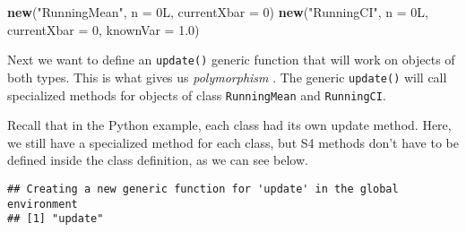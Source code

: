 \documentclass[12pt,krantz2]{krantz}
\makeatletter
\newenvironment{Shaded}{\begin{snugshade}}{\end{snugshade}}
\newcommand{\DataTypeTok}[1]{\textcolor[rgb]{0.27,0.27,0.27}{#1}}
\newcommand{\DecValTok}[1]{\textcolor[rgb]{0.06,0.06,0.06}{#1}}
\newcommand{\FloatTok}[1]{\textcolor[rgb]{0.06,0.06,0.06}{#1}}
\newcommand{\KeywordTok}[1]{\textcolor[rgb]{0.27,0.27,0.27}{\textbf{#1}}}
\newcommand{\NormalTok}[1]{#1}
\newcommand{\StringTok}[1]{\textcolor[rgb]{0.5,0.5,0.5}{#1}}
\newenvironment{kframe}{%
\medskip{}
\setlength{\fboxsep}{.8em}
 \def\at@end@of@kframe{}%
 \ifinner\ifhmode%
  \def\at@end@of@kframe{\end{minipage}}%
  \begin{minipage}{\columnwidth}%
 \fi\fi%
 \def\FrameCommand##1{\hskip\@totalleftmargin \hskip-\fboxsep
 \colorbox{shadecolor}{##1}\hskip-\fboxsep
     \hskip-\linewidth \hskip-\@totalleftmargin \hskip\columnwidth}%
 \MakeFramed {\advance\hsize-\width
   \@totalleftmargin\z@ \linewidth\hsize
   \@setminipage}}%
 {\par\unskip\endMakeFramed%
 \at@end@of@kframe}
\renewenvironment{Shaded}{\begin{kframe}}{\end{kframe}}
\makeatother
\begin{document}
\begin{Shaded}
\begin{Highlighting}[]
\KeywordTok{new}\NormalTok{(}\StringTok{"RunningMean"}\NormalTok{, }\DataTypeTok{n =}\NormalTok{ 0L, }\DataTypeTok{currentXbar =} \DecValTok{0}\NormalTok{)}
\KeywordTok{new}\NormalTok{(}\StringTok{"RunningCI"}\NormalTok{, }\DataTypeTok{n =}\NormalTok{ 0L, }\DataTypeTok{currentXbar =} \DecValTok{0}\NormalTok{, }\DataTypeTok{knownVar =} \FloatTok{1.0}\NormalTok{)}
\end{Highlighting}
\end{Shaded}

Next we want to define an \texttt{update()} generic function that will work on objects of both types. This is what gives us \emph{polymorphism} . The generic \texttt{update()} will call specialized methods for objects of class \texttt{RunningMean} and \texttt{RunningCI}.

Recall that in the Python example, each class had its own update method. Here, we still have a specialized method for each class, but S4 methods don't have to be defined inside the class definition, as we can see below.

\begin{verbatim}
## Creating a new generic function for 'update' in the global environment
## [1] "update"
\end{verbatim}
\end{document}
